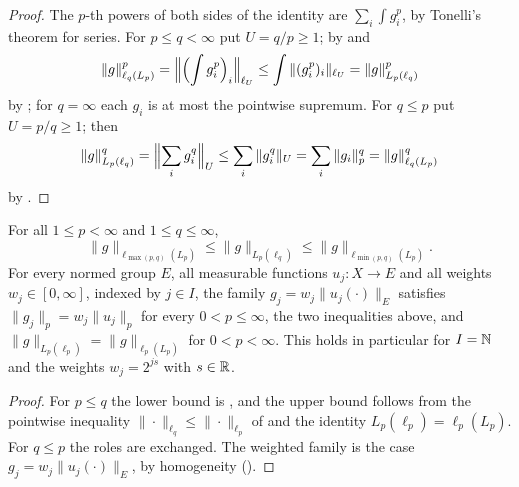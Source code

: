 \begin{proof}
\leanok
The $p$-th powers of both sides of the identity are $\sum_i \int g_i^p$, by Tonelli's theorem
for series. For $p \leq q < \infty$ put $U = q/p \geq 1$; by 
and 
\[
  \|g\|_{\ell_q(L_p)}^p = \Bigl\| \Bigl( \int g_i^p \Bigr)_i \Bigr\|_{\ell_U}
  \leq \int \|(g_i^p)_i\|_{\ell_U} = \|g\|_{L_p(\ell_q)}^p
\]
by ; for $q = \infty$ each $g_i$ is at most the pointwise
supremum. For $q \leq p$ put $U = p/q \geq 1$; then
\[
  \|g\|_{L_p(\ell_q)}^q = \Bigl\| \sum_i g_i^q \Bigr\|_U \leq \sum_i \|g_i^q\|_U
  = \sum_i \|g_i\|_p^q = \|g\|_{\ell_q(L_p)}^q
\]
by .
\end{proof}

\begin{corollary}
\label{cor:mixed-norm-sandwich}
\leanok
{}
For all $1 \leq p < \infty$ and $1 \leq q \leq \infty$,
\[
  \|g\|_{\ell_{\max(p,q)}(L_p)} \leq \|g\|_{L_p(\ell_q)} \leq \|g\|_{\ell_{\min(p,q)}(L_p)} .
\]
For every normed group $E$, all measurable functions $u_j : X \to E$ and all weights
$w_j \in [0, \infty]$, indexed by $j \in I$, the family $g_j = w_j \|u_j(\cdot)\|_E$ satisfies
$\|g_j\|_p = w_j \|u_j\|_p$ for every $0 < p \leq \infty$, the two inequalities above, and
$\|g\|_{L_p(\ell_p)} = \|g\|_{\ell_p(L_p)}$ for $0 < p < \infty$. This holds in particular for
$I = \mathbb{N}$ and the weights $w_j = 2^{js}$ with $s \in \mathbb{R}$.
\end{corollary}

\begin{proof}
\leanok
For $p \leq q$ the lower bound is , and the upper bound follows from the
pointwise inequality $\|\cdot\|_{\ell_q} \leq \|\cdot\|_{\ell_p}$ of  and the
identity $L_p(\ell_p) = \ell_p(L_p)$. For $q \leq p$ the roles are exchanged. The weighted family
is the case $g_j = w_j \|u_j(\cdot)\|_E$, by homogeneity ().
\end{proof}

